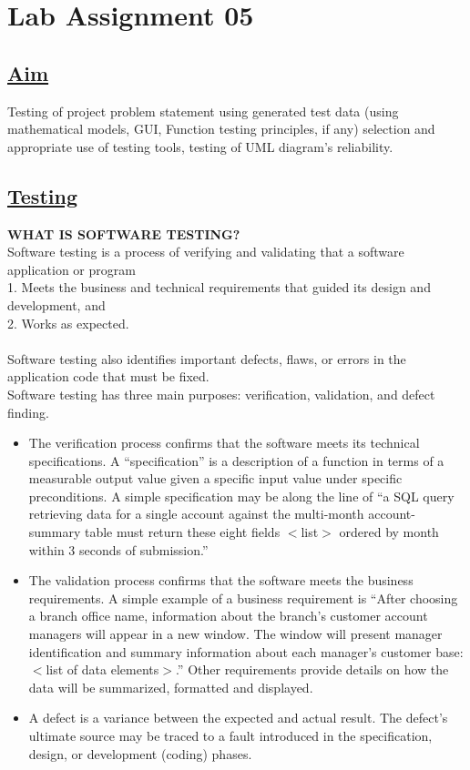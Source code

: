 \newpage
\section*{\centering\LARGE{Lab Assignment 05}}
\subsection*{\underline{Aim}}
Testing of project problem statement using generated test data (using mathematical models, GUI, Function testing principles, if any) selection and appropriate use of testing tools, testing of UML diagram's reliability.
\noindent
\subsection*{\underline{Testing}}
\textbf{WHAT IS SOFTWARE TESTING?}\\
\hspace{5em} Software testing is a process of verifying and validating that a software application or program\\
1. Meets the business and technical requirements that guided its design and development, and\\
2. Works as expected.\\\\
Software testing also identifies important defects, flaws, or errors in the application code that must be fixed.\\
\newline
\noindent
\hspace{5em}Software testing has three main purposes: verification, validation, and defect finding.
\begin{itemize}
 \item The verification process confirms that the software meets its technical specifications. A “specification” is a
description of a function in terms of a measurable output value given a specific input value under specific
preconditions. A simple specification may be along the line of “a SQL query retrieving data for a single
account against the multi-month account-summary table must return these eight fields $<$list$>$ ordered by
month within 3 seconds of submission.”
 \item The validation process confirms that the software meets the business requirements. A simple example of a
business requirement is “After choosing a branch office name, information about the branch’s customer account managers will appear in a new window. The window will present manager identification and summary information about each manager’s customer base: $<$list of data elements$>$.” Other requirements
provide details on how the data will be summarized, formatted and displayed.
 \item A defect is a variance between the expected and actual result. The defect’s ultimate source may be traced
to a fault introduced in the specification, design, or development (coding) phases. 
\end{itemize}
\newpage

